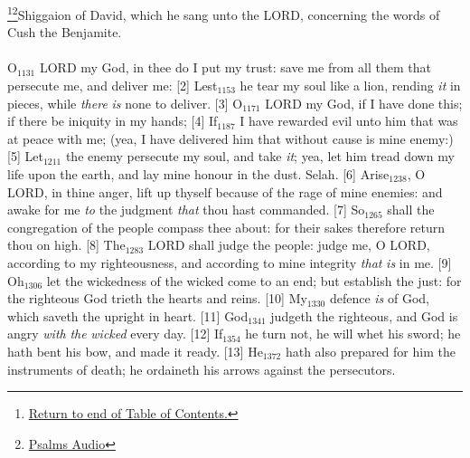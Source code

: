 \footnote{\textcolor[cmyk]{0.99998,1,0,0}{\hyperlink{TOC}{Return to end of Table of Contents.}}}\footnote{\href{https://audiobible.com/bible/bible.html}{\textcolor[cmyk]{0.99998,1,0,0}{Psalms Audio}}}\textcolor[cmyk]{0.99998,1,0,0}{Shiggaion of David, which he sang unto the LORD, concerning the words of Cush the Benjamite.}\\
\\
\textcolor[cmyk]{0.99998,1,0,0}{O\textcolor{jungle}{$_{1131}$} LORD my God, in thee do I put my trust: save me from all them that persecute me, and deliver me:}
[2] \textcolor[cmyk]{0.99998,1,0,0}{Lest\textcolor{jungle}{$_{1153}$} he tear my soul like a lion, rending \emph{it} in pieces, while \emph{there} \emph{is} none to deliver.}
[3] \textcolor[cmyk]{0.99998,1,0,0}{O\textcolor{jungle}{$_{1171}$} LORD my God, if I have done this; if there be iniquity in my hands;}
[4] \textcolor[cmyk]{0.99998,1,0,0}{If\textcolor{jungle}{$_{1187}$} I have rewarded evil unto him that was at peace with me; (yea, I have delivered him that without cause is mine enemy:)}
[5] \textcolor[cmyk]{0.99998,1,0,0}{Let\textcolor{jungle}{$_{1211}$} the enemy persecute my soul, and take \emph{it}; yea, let him tread down my life upon the earth, and lay mine honour in the dust. Selah.}
[6] \textcolor[cmyk]{0.99998,1,0,0}{Arise\textcolor{jungle}{$_{1238}$}, O LORD, in thine anger, lift up thyself because of the rage of mine enemies: and awake for me \emph{to} the judgment \emph{that} thou hast commanded.}
[7] \textcolor[cmyk]{0.99998,1,0,0}{So\textcolor{jungle}{$_{1265}$} shall the congregation of the people compass thee about: for their sakes therefore return thou on high.}
[8] \textcolor[cmyk]{0.99998,1,0,0}{The\textcolor{jungle}{$_{1283}$} LORD shall judge the people: judge me, O LORD, according to my righteousness, and according to mine integrity \emph{that} \emph{is} in me.}
[9] \textcolor[cmyk]{0.99998,1,0,0}{Oh\textcolor{jungle}{$_{1306}$} let the wickedness of the wicked come to an end; but establish the just: for the righteous God trieth the hearts and reins.}
[10] \textcolor[cmyk]{0.99998,1,0,0}{My\textcolor{jungle}{$_{1330}$} defence \emph{is} of God, which saveth the upright in heart.}
[11] \textcolor[cmyk]{0.99998,1,0,0}{God\textcolor{jungle}{$_{1341}$} judgeth the righteous, and God is angry \emph{with} \emph{the} \emph{wicked} every day.}
[12] \textcolor[cmyk]{0.99998,1,0,0}{If\textcolor{jungle}{$_{1354}$} he turn not, he will whet his sword; he hath bent his bow, and made it ready.}
[13] \textcolor[cmyk]{0.99998,1,0,0}{He\textcolor{jungle}{$_{1372}$} hath also prepared for him the instruments of death; he ordaineth his arrows against the persecutors.}
